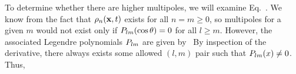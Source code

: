{	To determine whether there are higher multipoles, we will examine Eq.~.  We know from the fact that $\rho_n(\vb{x}, t)$ exists for all $n = m \geq 0$, so multipoles for a given $m$ would not exist only if $P_{l m}(\cos\theta) = 0$ for all $l \geq m$.  However, the associated Legendre polynomials $P_{l m}$ are given by~\cite{ALP}
	By inspection of the derivative, there always exists some allowed $(l, m)$ pair such that $P_{l m}(x) \neq 0$.  Thus, 
}